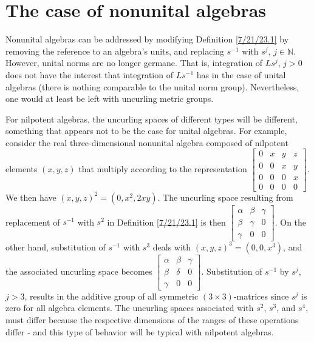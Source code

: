 \documentclass{amsart}
\numberwithin{equation}{section}
\theoremstyle{definition}
\numberwithin{theorem}{section}
\begin{document}
 \section{The case of nonunital algebras} Nonunital algebras can be addressed by modifying Definition \ref{7/21/23.1} by removing the reference to an algebra's units, and replacing $s^{-1}$ with $s^j$, $j \in \mathbb{N}$.   However, unital norms are no longer germane.  That is, integration of $Ls^j$, $j>0$ does not have the interest that integration of $Ls^{-1}$ has in the case of unital algebras (there is nothing comparable to the unital norm group).  Nevertheless, one would at least be left with uncurling metric groups.

For nilpotent algebras, the uncurling spaces of different types will be different, something that appears not to be the case for unital algebras.  For example, consider the real three-dimensional nonunital algebra composed of nilpotent elements $(x,y,z)$ that multiply according to the representation
  $ \left[
\begin{array}{ccccc}
0 & x & y & z  \\
0 & 0 & x & y \\
0 & 0 & 0 & x \\
0 & 0 & 0 & 0
\end{array}
\right] $.  We then have $(x,y,z)^2 = (0,x^2, 2xy)$.  The uncurling space resulting from replacement of $s^{-1}$ with  $s^2$ in Definition \ref{7/21/23.1} is then $\left[
\begin{array}{ccccc}
\alpha & \beta & \gamma   \\
\beta & \gamma & 0 \\
\gamma & 0 & 0  
\end{array}
\right] $.  On the other hand, substitution of $s^{-1}$ with $s^3$  deals with $(x,y,z)^3 = (0,0, x^3)$, and the associated uncurling space becomes $\left[
\begin{array}{ccccc}
\alpha & \beta & \gamma   \\
\beta & \delta & 0 \\
\gamma & 0 & 0  
\end{array}
\right] $.  Substitution of $s^{-1}$ by $s^j$, $j>3$, results in the additive group of all symmetric $(3\times 3)$-matrices since $s^j$ is zero for all algebra elements.  The uncurling spaces associated with $s^2$, $s^3$, and $s^4$, must differ because the respective dimensions of the ranges of these operations differ - and this type of behavior will be typical with nilpotent algebras.  
 
\end{document}
